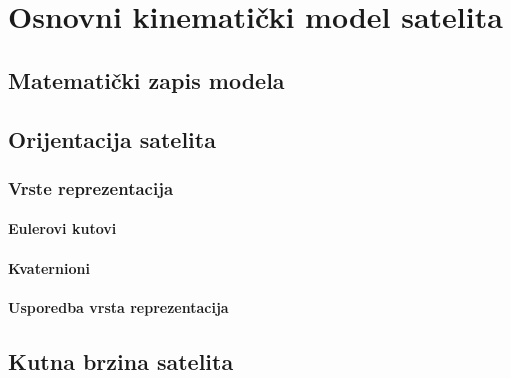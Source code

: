 \documentclass[times, utf8, diplomski, numeric]{templates/template}
\begin{document}
\chapter{Osnovni kinematički model satelita}{
    \section{Matematički zapis modela}{
    }
    
    \section{Orijentacija satelita}{   
        \subsection{Vrste reprezentacija}{
            \subsubsection{Eulerovi kutovi}{

            }

            \subsubsection{Kvaternioni}{

            }

            \subsubsection{Usporedba vrsta reprezentacija}{
    
            }
        }
    }
    
    \section{Kutna brzina satelita}{
    }
}
    
\end{document}
